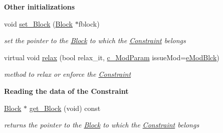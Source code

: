 \begin{Indent}\textbf{ Other initializations}\par
\begin{DoxyCompactItemize}
\item 
void \mbox{\hyperlink{class_s_m_spp__di__unipi__it_1_1_constraint_ae25adfb4d0355dc999de19a850b0025d}{set\+\_\+\+Block}} (\mbox{\hyperlink{class_s_m_spp__di__unipi__it_1_1_block}{Block}} $\ast$fblock)
\begin{DoxyCompactList}\small\item\em set the pointer to the \mbox{\hyperlink{class_s_m_spp__di__unipi__it_1_1_block}{Block}} to which the \mbox{\hyperlink{class_s_m_spp__di__unipi__it_1_1_constraint}{Constraint}} belongs \end{DoxyCompactList}\item 
virtual void \mbox{\hyperlink{class_s_m_spp__di__unipi__it_1_1_constraint_aec8d25421e0368c5cdb71e7c96f767f8}{relax}} (bool relax\+\_\+it, \mbox{\hyperlink{group___modification___t_y_p_e_s_ga544246d8c462e9a2d817c2c30797968f}{c\+\_\+\+Mod\+Param}} issue\+Mod=\mbox{\hyperlink{group___modification___t_y_p_e_s_gga48fddcdd03a03f49b7e389ca1ed938d4a21b14b26b1c0093a0905f6fc010bad29}{e\+Mod\+Blck}})
\begin{DoxyCompactList}\small\item\em method to relax or enforce the \mbox{\hyperlink{class_s_m_spp__di__unipi__it_1_1_constraint}{Constraint}} \end{DoxyCompactList}\end{DoxyCompactItemize}
\end{Indent}
\begin{Indent}\textbf{ Reading the data of the Constraint}\par
\begin{DoxyCompactItemize}
\item 
\mbox{\label{class_s_m_spp__di__unipi__it_1_1_constraint_abb90eec380b99ebb3d015f6d5f9e26b8}} 
\mbox{\hyperlink{class_s_m_spp__di__unipi__it_1_1_block}{Block}} $\ast$ \mbox{\hyperlink{class_s_m_spp__di__unipi__it_1_1_constraint_abb90eec380b99ebb3d015f6d5f9e26b8}{get\+\_\+\+Block}} (void) const
\begin{DoxyCompactList}\small\item\em returns the pointer to the \mbox{\hyperlink{class_s_m_spp__di__unipi__it_1_1_block}{Block}} to which the \mbox{\hyperlink{class_s_m_spp__di__unipi__it_1_1_constraint}{Constraint}} belongs \end{DoxyCompactList}\end{DoxyCompactItemize}
\end{Indent}

